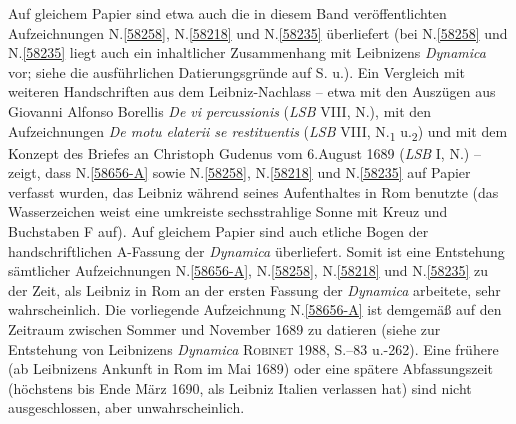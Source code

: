 Auf gleichem Papier sind etwa auch die in diesem Band veröffentlichten Aufzeichnungen N.\;\ref{58258}, N.\;\ref{58218} und N.\;\ref{58235} %
überliefert (bei N.\;\ref{58258} und N.\;\ref{58235} liegt auch ein inhaltlicher Zusammenhang mit Leibnizens \textit{Dynamica} vor; siehe die ausführlichen Datierungsgründe auf S.\;\pageref{58258_dat} u.\;\pageref{58235_dat}).
Ein Vergleich mit weiteren Handschriften aus dem Leibniz-Nachlass
-- etwa mit %
den Auszügen aus Giovanni Alfonso Borellis \textit{De vi percussionis}\cite{01001} (\textit{LSB} VIII, N.),\cite{02602}
mit den Aufzeichnungen \textit{De motu elaterii se restituentis} (\textit{LSB} VIII, N.\textsubscript{1} u.\textsubscript{2})\cite{02603}
und mit %
dem Konzept des Briefes an Christoph Gudenus vom 6.\;August 1689 (\textit{LSB} I, N.)\cite{01297}
-- zeigt,
dass N.\;\ref{58656-A} sowie N.\;\ref{58258}, N.\;\ref{58218} und N.\;\ref{58235} auf Papier verfasst wurden, das Leibniz während seines Aufenthaltes in Rom benutzte (das Wasserzeichen weist eine umkreiste sechsstrahlige Sonne mit Kreuz und Buchstaben F auf). %
Auf gleichem Papier sind auch etliche Bogen der handschriftlichen A-Fassung der \textit{Dynamica}\cite{01354} überliefert.
Somit ist eine Entstehung sämtlicher Aufzeichnungen N.\;\ref{58656-A}, N.\;\ref{58258}, N.\;\ref{58218} und N.\;\ref{58235} zu der Zeit, als Leibniz in Rom an der ersten Fassung der \textit{Dynamica}\cite{01354} arbeitete, sehr wahrscheinlich.
\pend%
\pstart%
Die vorliegende Aufzeichnung N.\;\ref{58656-A} ist demgemäß auf den Zeitraum zwischen Sommer und November 1689 zu datieren (siehe zur Entstehung von Leibnizens \textit{Dynamica}\cite{01354} \textsc{Robinet} 1988, S.--83 u.-262).\cite{01240}
Eine frühere (ab Leibnizens Ankunft in Rom im Mai 1689) oder eine spätere Abfassungszeit (höchstens bis Ende März 1690, als Leibniz Italien verlassen hat) sind nicht ausgeschlossen, aber unwahrscheinlich.%
\pend%
%
\frenchspacing%
\normalsize%
\newpage%
